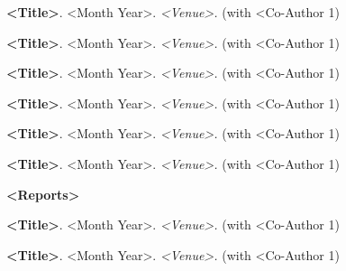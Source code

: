 \begin{cventries}
  \cventry
    {\textbf{\color{darkgray} }}
    {}
    {}
    {}
    {
      \begin{cvitems}
      	\item {\textbf{<Title>}. <Month Year>. \textit{<Venue>.} (with <Co-Author 1)}
      	\item {\textbf{<Title>}. <Month Year>. \textit{<Venue>.} (with <Co-Author 1)}
      \end{cvitems}    
    }
  \cventry
    {\textbf{\color{darkgray} }}
    {}
    {}
    {}
    {
      \begin{cvitems}
      	\item {\textbf{<Title>}. <Month Year>. \textit{<Venue>.} (with <Co-Author 1)}
      	\item {\textbf{<Title>}. <Month Year>. \textit{<Venue>.} (with <Co-Author 1)}
      \end{cvitems}    
    }
  \cventry
    {\textbf{\color{darkgray} }}
    {}
    {}
    {}
    {
      \begin{cvitems}
      	\item {\textbf{<Title>}. <Month Year>. \textit{<Venue>.} (with <Co-Author 1)}
      	\item {\textbf{<Title>}. <Month Year>. \textit{<Venue>.} (with <Co-Author 1)}
      \end{cvitems}    
    }
	 \cventry
	{\color{darkgray} \textbf{\normalsize <Reports>}}
	{}
	{}
	{}
	{
	  \begin{cvitems}
	  	\item {\textbf{<Title>}. <Month Year>. \textit{<Venue>.} (with <Co-Author 1)}
	  \end{cvitems}    
	}
	 \cventry
	{\color{darkgray} \textbf{\normalsize <Book Chapters>}}
	{}
	{}
	{}
	{
		\begin{cvitems}
			\item {\textbf{<Title>}. <Month Year>. \textit{<Venue>.} (with <Co-Author 1)}
		\end{cvitems}    
	}
	\vspace{-2mm}
\end{cventries}
